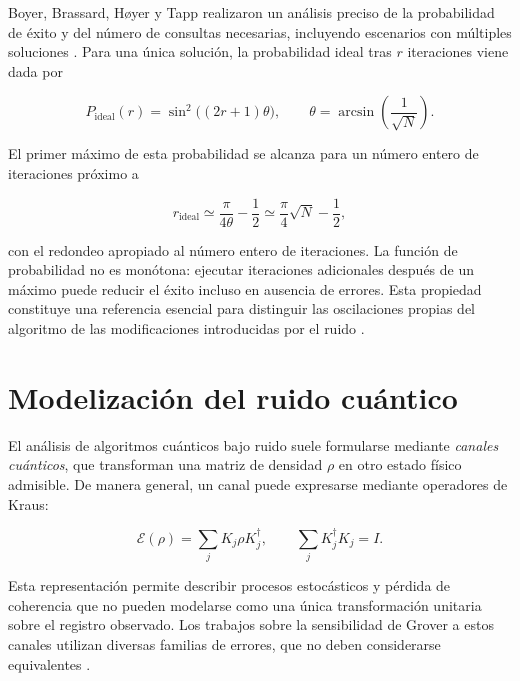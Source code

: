 \documentclass[11pt,a4paper]{article}
\begin{document}
Boyer, Brassard, H\o yer y Tapp realizaron un análisis preciso de la probabilidad de éxito y del número de consultas necesarias, incluyendo escenarios con múltiples soluciones \cite{boyer1998}. Para una única solución, la probabilidad ideal tras $r$ iteraciones viene dada por

\begin{equation}
    P_{\mathrm{ideal}}(r)=\sin^2\!\bigl((2r+1)\theta\bigr),
    \qquad
    \theta=\arcsin\!\left(\frac{1}{\sqrt{N}}\right).
    \label{eq:grover_ideal}
\end{equation}

El primer máximo de esta probabilidad se alcanza para un número entero de iteraciones próximo a

\begin{equation}
    r_{\mathrm{ideal}}\simeq\frac{\pi}{4\theta}-\frac{1}{2}
    \simeq\frac{\pi}{4}\sqrt{N}-\frac{1}{2},
    \label{eq:iteraciones_ideales}
\end{equation}

con el redondeo apropiado al número entero de iteraciones. La función de probabilidad no es monótona: ejecutar iteraciones adicionales después de un máximo puede reducir el éxito incluso en ausencia de errores. Esta propiedad constituye una referencia esencial para distinguir las oscilaciones propias del algoritmo de las modificaciones introducidas por el ruido \cite{boyer1998}.

\section{Modelización del ruido cuántico}

El análisis de algoritmos cuánticos bajo ruido suele formularse mediante \emph{canales cuánticos}, que transforman una matriz de densidad $\rho$ en otro estado físico admisible. De manera general, un canal puede expresarse mediante operadores de Kraus:

\begin{equation}
    \mathcal{E}(\rho)=\sum_j K_j\rho K_j^{\dagger},
    \qquad \sum_j K_j^{\dagger}K_j=I.
\end{equation}

Esta representación permite describir procesos estocásticos y pérdida de coherencia que no pueden modelarse como una única transformación unitaria sobre el registro observado. Los trabajos sobre la sensibilidad de Grover a estos canales utilizan diversas familias de errores, que no deben considerarse equivalentes \cite{ijaz2023,khan2026}.
\end{document}
